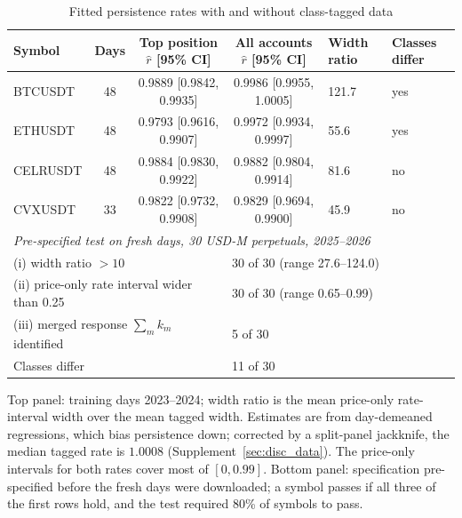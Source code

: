 \documentclass[12pt]{article}
\theoremstyle{definition}
\theoremstyle{remark}
\begin{document}
\begin{table}[t]\centering\small
\begin{threeparttable}
\caption{Fitted persistence rates with and without class-tagged data}\label{tab:disc}
\setlength{\tabcolsep}{3pt}
\begin{tabular}{lcccp{}p{}}
\toprule
Symbol & Days & Top position $\hat r$ [95\% CI] & All accounts $\hat r$ [95\% CI] & Width ratio & Classes differ\\
\midrule
BTCUSDT & 48 & 0.9889 [0.9842, 0.9935] & 0.9986 [0.9955, 1.0005] & 121.7 & yes\\
ETHUSDT & 48 & 0.9793 [0.9616, 0.9907] & 0.9972 [0.9934, 0.9997] & 55.6 & yes\\
CELRUSDT & 48 & 0.9884 [0.9830, 0.9922] & 0.9882 [0.9804, 0.9914] & 81.6 & no\\
CVXUSDT & 33 & 0.9822 [0.9732, 0.9908] & 0.9829 [0.9694, 0.9900] & 45.9 & no\\
\midrule
\multicolumn{6}{l}{\emph{Pre-specified test on fresh days, 30 USD-M perpetuals, 2025--2026}}\\
\multicolumn{3}{l}{(i) width ratio $>10$} & \multicolumn{3}{l}{30 of 30 (range 27.6--124.0)}\\
\multicolumn{3}{l}{(ii) price-only rate interval wider than 0.25} & \multicolumn{3}{l}{30 of 30 (range 0.65--0.99)}\\
\multicolumn{3}{l}{(iii) merged response $\sum_mk_m$ identified} & \multicolumn{3}{l}{5 of 30}\\
\multicolumn{3}{l}{Classes differ} & \multicolumn{3}{l}{11 of 30}\\
\bottomrule
\end{tabular}
\begin{tablenotes}\footnotesize\item Top panel: training days 2023--2024; width ratio is the mean price-only rate-interval width over the mean tagged width. Estimates are from day-demeaned regressions, which bias persistence down; corrected by a split-panel jackknife, the median tagged rate is $1.0008$ (Supplement~\ref{sec:disc_data}). The price-only intervals for both rates cover most of $[0,0.99]$. Bottom panel: specification pre-specified before the fresh days were downloaded; a symbol passes if all three of the first rows hold, and the test required 80\% of symbols to pass. \end{tablenotes}
\end{threeparttable}
\end{table}
\end{document}
